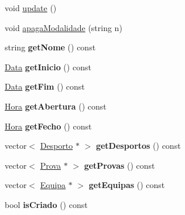 \begin{DoxyCompactItemize}
\item 
void \hyperlink{class_campeonato_a5275bcacc59fce709dbf4882d9c1cb29}{update} ()
\item 
void \hyperlink{class_campeonato_a5179d21ac3e5bbdf1c86c1a76b794297}{apaga\+Modalidade} (string n)
\item 
\hypertarget{class_campeonato_ae014ca753715e808b6d67c73f241f27d}{}string {\bfseries get\+Nome} () const \label{class_campeonato_ae014ca753715e808b6d67c73f241f27d}

\item 
\hypertarget{class_campeonato_ae83d9024711025a0b40a4c8d8a25b425}{}\hyperlink{class_data}{Data} {\bfseries get\+Inicio} () const \label{class_campeonato_ae83d9024711025a0b40a4c8d8a25b425}

\item 
\hypertarget{class_campeonato_a90e5bab79b89854d47c7ab14e2da6091}{}\hyperlink{class_data}{Data} {\bfseries get\+Fim} () const \label{class_campeonato_a90e5bab79b89854d47c7ab14e2da6091}

\item 
\hypertarget{class_campeonato_a5512a431adabb96f9b2493b02c06aad6}{}\hyperlink{class_hora}{Hora} {\bfseries get\+Abertura} () const \label{class_campeonato_a5512a431adabb96f9b2493b02c06aad6}

\item 
\hypertarget{class_campeonato_af6dce5eaa07d2683e0417f0f72ce0b72}{}\hyperlink{class_hora}{Hora} {\bfseries get\+Fecho} () const \label{class_campeonato_af6dce5eaa07d2683e0417f0f72ce0b72}

\item 
\hypertarget{class_campeonato_acfd3604e5b4e6e6683dc91a93d353b94}{}vector$<$ \hyperlink{class_desporto}{Desporto} $\ast$ $>$ {\bfseries get\+Desportos} () const \label{class_campeonato_acfd3604e5b4e6e6683dc91a93d353b94}

\item 
\hypertarget{class_campeonato_aa0e20ae7c1e4224a9969f8a92fd2c4fa}{}vector$<$ \hyperlink{class_prova}{Prova} $\ast$ $>$ {\bfseries get\+Provas} () const \label{class_campeonato_aa0e20ae7c1e4224a9969f8a92fd2c4fa}

\item 
\hypertarget{class_campeonato_ac82ee7c13b116b71525cff9f557b45c2}{}vector$<$ \hyperlink{class_equipa}{Equipa} $\ast$ $>$ {\bfseries get\+Equipas} () const \label{class_campeonato_ac82ee7c13b116b71525cff9f557b45c2}

\item 
\hypertarget{class_campeonato_a2289b23011da7a56382feb8bf01833a2}{}bool {\bfseries is\+Criado} () const \label{class_campeonato_a2289b23011da7a56382feb8bf01833a2}


\end{DoxyCompactItemize}

